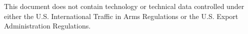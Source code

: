 \documentclass{jib}
\begin{document}
\begin{abstract}


\end{abstract}

This document does not contain technology or technical data controlled under either the U.S. International Traffic in Arms Regulations or the U.S. Export Administration Regulations.


\end{document}

